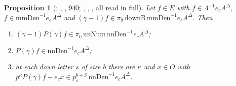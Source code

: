 \documentclass[11pt]{article}
\newtheorem{prop}[lemma]{Proposition}
\theoremstyle{definition}
\theoremstyle{remark}
\begin{document}
\begin{prop}[; , , 940; , , , all read in full]
Let $f\in E$ with $f\in\Lambda^{-1}e_cA^\Delta$, $f\in\mathrm{mmDen}^{-1}e_cA^\Delta$ and $(\gamma-1)f\in\pi_0\,\mathrm{downB}\,\mathrm{mmDen}^{-1}e_cA^\Delta$. Then
\begin{enumerate}[label=(\alph*),leftmargin=*,itemsep=1pt]
\item $(\gamma-1)P(\gamma)f\in\pi_0\,\mathrm{nnNum}\,\mathrm{nnDen}^{-1}e_cA^\Delta$;
\item $P(\gamma)f\in\mathrm{nnDen}^{-1}e_cA^\Delta$;
\item at each down letter $s$ of size $b$ there are $\kappa$ and $x\in O$ with $p^\kappa P(\gamma)f-e_cx\in p_s^{b+S}\,\mathrm{nnDen}^{-1}e_cA^\Delta$.
\end{enumerate}
\end{prop}
\end{document}
